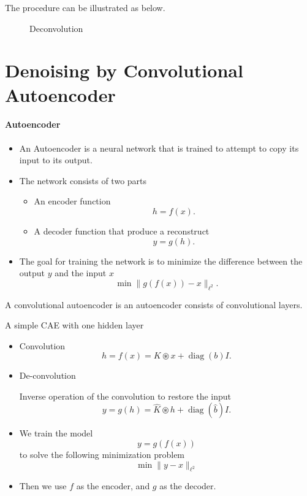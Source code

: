 The procedure can be illustrated as below.
\begin{figure}[htbp]
\caption{Deconvolution}
\end{figure}

\section{Denoising by Convolutional Autoencoder}

\paragraph{Autoencoder}
    \begin{itemize}
        \item An Autoencoder is a neural network that is trained to attempt to copy its input to its output.
        \item The network consists of two parts
            \begin{itemize}
                \item An encoder function
                    \begin{equation*}
                        h=f(x).
                    \end{equation*}
                \item A decoder function that produce a reconstruct
                    \begin{equation*}
                        y=g(h).
                    \end{equation*}
            \end{itemize}
        \item The goal for training the network is to minimize the difference between the output $y$ and  the input $x$
            $$
                \min \|g(f(x))-x\|_{\ell^2}.
            $$
    \end{itemize}


A convolutional autoencoder is an autoencoder consists of convolutional layers.  
    
A simple CAE with one hidden layer 
\begin{itemize}
\item Convolution
    $$h=f(x)=K\circledast x+\operatorname{diag}(b)I.$$

\item De-convolution

    Inverse operation of the convolution to restore the input
        $$y=g(h)=\hat{K}\circledast h+\operatorname{diag}(\hat b)I.$$


\item We train the model 
    $$y=g(f(x))$$
   to solve the following minimization problem 
        $$\min\|y-x\|_{\ell^2}$$
\item Then we use $f$ as the encoder, and $g$ as the decoder.

\end{itemize}

